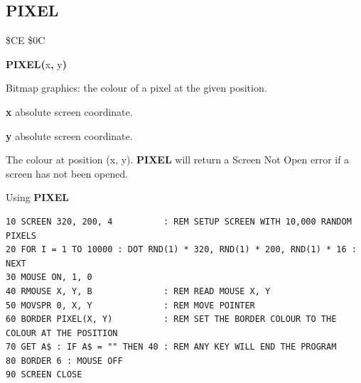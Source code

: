 
\newpage
\subsection{PIXEL}
\begin{description}[leftmargin=2cm,style=nextline]
\item [Token:]    \$CE \$0C

\item [Format:]   {\bf PIXEL(}x{\bf,} y{\bf)}

\item [Usage:]    Bitmap graphics: the colour of a pixel at the given position.

                  {\bf x} absolute screen coordinate.

                  {\bf y} absolute screen coordinate.

\item [Returns:]  The colour at position (x, y). {\bf PIXEL} will return a Screen Not Open error if a screen has not been opened.

\item [Example:]  Using {\bf PIXEL}

\begin{tcolorbox}[colback=black,coltext=white]
\verbatimfont{\codefont}
\begin{verbatim}
10 SCREEN 320, 200, 4          : REM SETUP SCREEN WITH 10,000 RANDOM PIXELS
20 FOR I = 1 TO 10000 : DOT RND(1) * 320, RND(1) * 200, RND(1) * 16 : NEXT
30 MOUSE ON, 1, 0
40 RMOUSE X, Y, B              : REM READ MOUSE X, Y
50 MOVSPR 0, X, Y              : REM MOVE POINTER
60 BORDER PIXEL(X, Y)          : REM SET THE BORDER COLOUR TO THE COLOUR AT THE POSITION
70 GET A$ : IF A$ = "" THEN 40 : REM ANY KEY WILL END THE PROGRAM
80 BORDER 6 : MOUSE OFF
90 SCREEN CLOSE
\end{verbatim}
\end{tcolorbox}
\end{description}


\newpage
